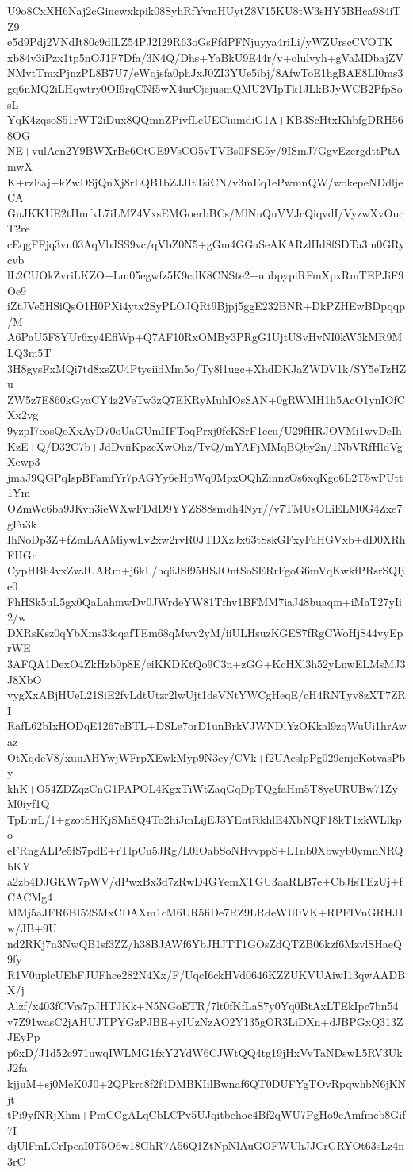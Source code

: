 U9o8CxXH6Naj2cGincwxkpik08SyhRfYvmHUytZ8V15KU8tW3sHY5BHca984iTZ9
e5d9Pdj2VNdIt80c9dlLZ54PJ2I29R63oGsFfdPFNjuyya4riLi/yWZUrscCVOTK
xb84v3iPzx1tp5nOJ1F7Dfa/3N4Q/Dhs+YaBkU9E44r/v+olulvyh+gVaMDbajZV
NMvtTmxPjnzPL8B7U7/eWqjsfa0phJxJ0ZI3YUe5ibj/8AfwToE1hgBAE8LI0ms3
gq6nMQ2iLHqwtry0OI9rqCNf5wX4urCjejusmQMU2VIpTk1JLkBJyWCB2PfpSosL
YqK4zqsoS51rWT2iDux8QQmnZPivfLeUECiumdiG1A+KB3ScHtxKhbfgDRH568OG
NE+vulAcn2Y9BWXrBe6CtGE9VsCO5vTVBs0FSE5y/9ISmJ7GgvEzergdttPtAmwX
K+rzEaj+kZwDSjQnXj8rLQB1bZJJItTsiCN/v3mEq1ePwmnQW/wokepeNDdljeCA
GuJKKUE2tHmfxL7iLMZ4VxsEMGoerbBCs/MlNuQuVVJcQiqvdI/VyzwXvOucT2re
cEqgFFjq3vu03AqVbJSS9vc/qVbZ0N5+gGm4GGaSeAKARzlHd8fSDTa3m0GRycvb
lL2CUOkZvriLKZO+Lm05egwfz5K9cdK8CNSte2+uubpypiRFmXpxRmTEPJiF9Oe9
iZtJVe5HSiQsO1H0PXi4ytx2SyPLOJQRt9Bjpj5ggE232BNR+DkPZHEwBDpqqp/M
A6PaU5F8YUr6xy4EfiWp+Q7AF10RxOMBy3PRgG1UjtUSvHvNI0kW5kMR9MLQ3m5T
3H8gysFxMQi7td8xsZU4PtyeiidMm5o/Ty8l1ugc+XhdDKJaZWDV1k/SY5eTzHZu
ZW5z7E860kGyaCY4z2VeTw3zQ7EKRyMuhIOsSAN+0gRWMH1h5AcO1ynIOfCXx2vg
9yzpI7eosQoXxAyD70oUaGUmIIFToqPrxj0feKSrF1ccu/U29fHRJOVMi1wvDeIh
KzE+Q/D32C7b+JdDviiKpzcXwOhz/TvQ/mYAFjMMqBQby2n/1NbVRfHldVgXewp3
jmaJ9QGPqIspBFamfYr7pAGYy6eHpWq9MpxOQhZinnzOs6xqKgo6L2T5wPUtt1Ym
OZmWc6ba9JKvn3ieWXwFDdD9YYZS88smdh4Nyr//v7TMUsOLiELM0G4Zxe7gFu3k
IhNoDp3Z+fZmLAAMiywLv2xw2rvR0JTDXzJx63tSskGFxyFaHGVxb+dD0XRhFHGr
CypHBh4vxZwJUARm+j6kL/hq6JSf95HSJOntSoSERrFgoG6mVqKwkfPRsrSQIje0
FhHSk5uL5gx0QaLahmwDv0JWrdeYW81Tfhv1BFMM7iaJ48buaqm+iMaT27yIi2/w
DXRsKsz0qYbXms33cqafTEm68qMwv2yM/iiULHsuzKGES7fRgCWoHjS44vyEprWE
3AFQA1DexO4ZkHzb0p8E/eiKKDKtQo9C3n+zGG+KcHXl3h52yLnwELMsMJ3J8XbO
vygXxABjHUeL21SiE2fvLdtUtzr2lwUjt1dsVNtYWCgHeqE/cH4RNTyv8zXT7ZRI
RafL62bIxHODqE1267cBTL+DSLe7orD1unBrkVJWNDlYzOKkal9zqWuUi1hrAwaz
OtXqdcV8/xuuAHYwjWFrpXEwkMyp9N3cy/CVk+f2UAeslpPg029cnjeKotvasPby
khK+O54ZDZqzCnG1PAPOL4KgxTiWtZaqGqDpTQgfaHm5T8yeURUBw71ZyM0iyf1Q
TpLurL/1+gzotSHKjSMiSQ4To2hiJmLijEJ3YEntRkhlE4XbNQF18kT1xkWLlkpo
eFRngALPe5fS7pdE+rTlpCu5JRg/L0IOabSoNHvvppS+LTnb0Xbwyb0ymnNRQbKY
a2zb4DJGKW7pWV/dPwxBx3d7zRwD4GYemXTGU3aaRLB7e+CbJfsTEzUj+fCACMg4
MMj5aJFR6BI52SMxCDAXm1cM6UR5fiDe7RZ9LRdeWU0VK+RPFIVnGRHJ1w/JB+9U
nd2RKj7n3NwQB1sf3ZZ/h38BJAWf6YbJHJTT1GOsZdQTZB06kzf6MzvlSHaeQ9fy
R1V0uplcUEbFJUFhce282N4Xx/F/UqcI6ckHVd0646KZZUKVUAiwI13qwAADBX/j
Alzf/x403fCVrs7pJHTJKk+N5NGoETR/7lt0fKfLaS7y0Yq0BtAxLTEkIpc7bn54
v7Z91wasC2jAHUJTPYGzPJBE+yIUzNzAO2Y135gOR3LiDXn+dJBPGxQ313ZJEyPp
p6xD/J1d52c971uwqIWLMG1fxY2YdW6CJWtQQ4tg19jHxVvTaNDswL5RV3UkJ2fa
kjjuM+sj0MeK0J0+2QPkrc8f2f4DMBKIilBwnaf6QT0DUFYgTOvRpqwhbN6jKNjt
tPi9yfNRjXhm+PmCCgALqCbLCPv5UJqitbehoc4Bf2qWU7PgHo9cAmfmcb8Gif7I
djUlFmLCrIpeaI0T5O6w18GhR7A56Q1ZtNpNlAuGOFWUhJJCrGRYOt63sLz4n3rC
